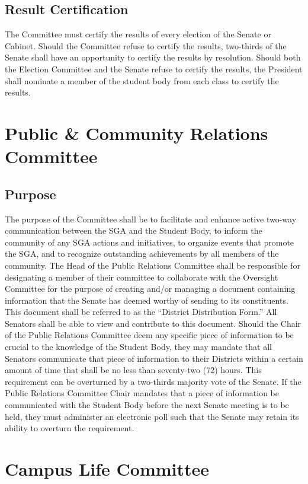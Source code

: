 \documentclass[12pt]{scrreprt}
\begin{document}
\subsection{Result Certification}
The Committee must certify the results of every election of the Senate or 
Cabinet. Should the Committee refuse to certify the results, two-thirds of the 
Senate shall have an opportunity to certify the results by resolution. Should both the Election Committee and the Senate refuse to certify the results, the President shall nominate a member of the student body from each class to certify
the results. 

\section{Public \& Community Relations Committee}

\subsection{Purpose}
The purpose of the Committee shall be to facilitate and enhance active two-way
communication between the SGA and the Student Body, to inform the community of 
any SGA actions and initiatives, to organize events that promote the SGA, and 
to recognize outstanding achievements by all members of the community. The Head of the Public Relations Committee shall be responsible for designating a member of their committee to collaborate with the Oversight Committee for the purpose of creating and/or managing a document containing information that the Senate has deemed worthy of sending to its constituents. This document shall be referred to as the “District Distribution Form.” All Senators shall be able to view and contribute to this document. 
Should the Chair of the Public Relations Committee deem any specific piece of information to be crucial to the knowledge of the Student Body, they may mandate that all Senators communicate that piece of information to their Districts within a certain amount of time that shall be no less than seventy-two (72) hours. This requirement can be overturned by a two-thirds majority vote of the Senate. If the Public Relations Committee Chair mandates that a piece of information be communicated with the Student Body before the next Senate meeting is to be held, they must administer an electronic poll such that the Senate may retain its ability to overturn the requirement.

\section{Campus Life Committee}
\end{document}
